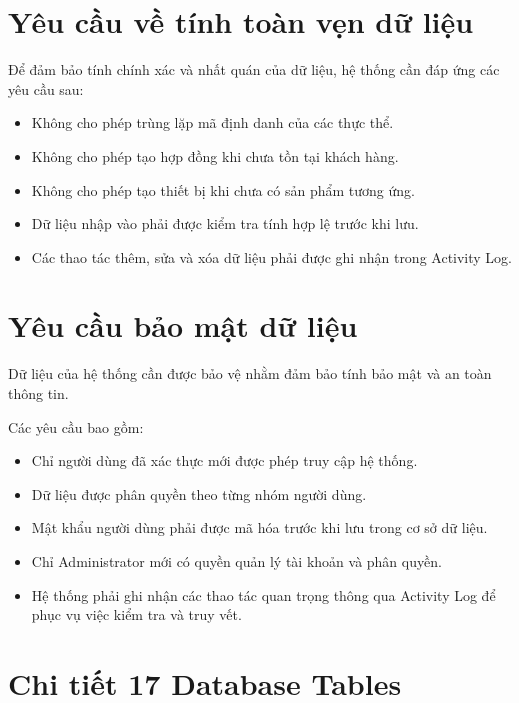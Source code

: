 \section{Yêu cầu về tính toàn vẹn dữ liệu}

Để đảm bảo tính chính xác và nhất quán của dữ liệu, hệ thống cần đáp ứng các yêu cầu sau:

\begin{itemize}
    \item Không cho phép trùng lặp mã định danh của các thực thể.
    \item Không cho phép tạo hợp đồng khi chưa tồn tại khách hàng.
    \item Không cho phép tạo thiết bị khi chưa có sản phẩm tương ứng.
    \item Dữ liệu nhập vào phải được kiểm tra tính hợp lệ trước khi lưu.
    \item Các thao tác thêm, sửa và xóa dữ liệu phải được ghi nhận trong Activity Log.
\end{itemize}

\section{Yêu cầu bảo mật dữ liệu}

Dữ liệu của hệ thống cần được bảo vệ nhằm đảm bảo tính bảo mật và an toàn thông tin.

Các yêu cầu bao gồm:

\begin{itemize}
    \item Chỉ người dùng đã xác thực mới được phép truy cập hệ thống.
    \item Dữ liệu được phân quyền theo từng nhóm người dùng.
    \item Mật khẩu người dùng phải được mã hóa trước khi lưu trong cơ sở dữ liệu.
    \item Chỉ Administrator mới có quyền quản lý tài khoản và phân quyền.
    \item Hệ thống phải ghi nhận các thao tác quan trọng thông qua Activity Log để phục vụ việc kiểm tra và truy vết.
\end{itemize}

\section{Chi tiết 17 Database Tables}

